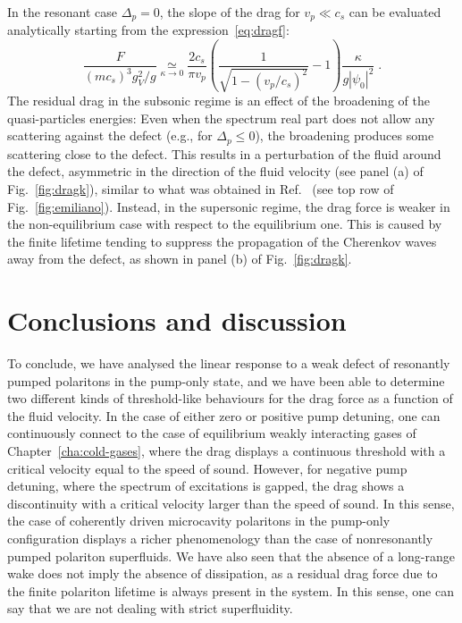In the resonant case $\Delta_p=0$, the slope of the
drag for $v_p \ll c_s$ can be evaluated analytically starting from the
expression~\eqref{eq:dragf}:
%
\begin{equation*}
    \frac{F}{(mc_s)^3 g_V^2/g} \mathop{\simeq}\limits_{\kappa \to 0} \frac{2 c_s}{\pi
      v_p} \left( \frac{1}{ \sqrt{1-(v_p/c_s)^2}} - 1 \right)
    \frac{\kappa}{g |\psi_0|^2} \; .
\end{equation*}
%
The residual drag in the subsonic regime is an effect of the
broadening of the quasi-particles energies: Even when the spectrum
real part does not allow any scattering against the defect (e.g., for
$\Delta_p \le 0$), the broadening produces some scattering close to
the defect. This results in a perturbation of the fluid around the
defect, asymmetric in the direction of the fluid velocity (see panel
(a) of Fig.~\ref{fig:dragk}), similar to what was obtained in
Ref.~\cite{Cancellieri_2010} (see top row of
Fig.~\ref{fig:emiliano}). Instead, in the supersonic regime, the drag
force is weaker in the non-equilibrium case with respect to the
equilibrium one. This is caused by the finite lifetime tending to
suppress the propagation of the Cherenkov waves away from the defect,
as shown in panel (b) of Fig.~\ref{fig:dragk}.


\section{Conclusions and discussion}
\label{sec:concl}
%
To conclude, we have analysed the linear response to a weak defect of
resonantly pumped polaritons in the pump-only state, and we have been
able to determine two different kinds of threshold-like behaviours for
the drag force as a function of the fluid velocity. In the case of
either zero or positive pump detuning, one can continuously connect to
the case of equilibrium weakly interacting gases of
Chapter~\ref{cha:cold-gases}, where the drag displays a continuous
threshold with a critical velocity equal to the speed of
sound. However, for negative pump detuning, where the spectrum of
excitations is gapped, the drag shows a discontinuity with a critical
velocity larger than the speed of sound. In this sense, the case of
coherently driven microcavity polaritons in the pump-only
configuration displays a richer phenomenology than the case of
nonresonantly pumped polariton superfluids. We have also seen that the
absence of a long-range wake does not imply the absence of
dissipation, as a residual drag force due to the finite polariton
lifetime is always present in the system. In this sense, one can say
that we are not dealing with strict superfluidity.


